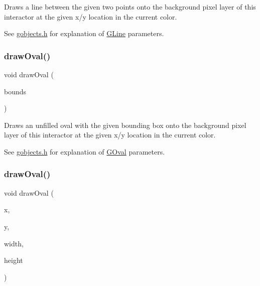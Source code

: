 Draws a line between the given two points onto the background pixel layer of this interactor at the given x/y location in the current color. 

See \mbox{\hyperlink{gobjects_8h_source}{gobjects.\+h}} for explanation of \mbox{\hyperlink{classsgl_1_1GLine}{G\+Line}} parameters. \mbox{\label{classsgl_1_1GDrawingSurface_a8adc13027efe311b4a6a715205b8bc46}} 
\subsubsection{\texorpdfstring{draw\+Oval()}{drawOval()}\hspace{0.1cm}{\footnotesize\ttfamily [1/2]}}
{\footnotesize\ttfamily void draw\+Oval (\begin{DoxyParamCaption}\item[{const \mbox{\hyperlink{structsgl_1_1GRectangle}{G\+Rectangle}} \&}]{bounds }\end{DoxyParamCaption})\hspace{0.3cm}{\ttfamily [virtual]}}



Draws an unfilled oval with the given bounding box onto the background pixel layer of this interactor at the given x/y location in the current color. 

See \mbox{\hyperlink{gobjects_8h_source}{gobjects.\+h}} for explanation of \mbox{\hyperlink{classsgl_1_1GOval}{G\+Oval}} parameters. \mbox{\label{classsgl_1_1GDrawingSurface_aa5b1cf902e578907da3c63060686354e}} 
\subsubsection{\texorpdfstring{draw\+Oval()}{drawOval()}\hspace{0.1cm}{\footnotesize\ttfamily [2/2]}}
{\footnotesize\ttfamily void draw\+Oval (\begin{DoxyParamCaption}\item[{double}]{x,  }\item[{double}]{y,  }\item[{double}]{width,  }\item[{double}]{height }\end{DoxyParamCaption})\hspace{0.3cm}{\ttfamily [virtual]}}



